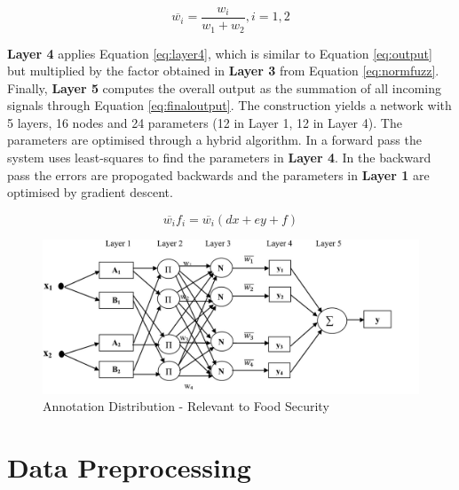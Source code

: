 \begin{equation} \label{eq:normfuzz}
\overline{w_i} =  \frac{w_i}{w_1 + w_2}, i = 1,2 \end{equation}

 \textbf{Layer 4} applies Equation \ref{eq:layer4}, which is similar to Equation \ref{eq:output} but multiplied by the factor obtained in \textbf{Layer 3} from Equation \ref{eq:normfuzz}. Finally, \textbf{Layer 5} computes the overall output as the summation of all incoming signals through Equation \ref{eq:finaloutput}. The construction yields a network with 5 layers,  16 nodes and 24 parameters (12 in Layer 1, 12 in Layer 4). The parameters are optimised through a hybrid algorithm. In a forward pass the system uses least-squares to find the parameters in \textbf{Layer 4}. In the backward pass the errors are propogated backwards and the parameters in \textbf{Layer 1} are optimised by gradient descent.  
 
 \begin{equation} \label{eq:layer4}
 \overline{w_i} f_i =  \overline{w_i }(dx + ey + f) \end{equation}



\begin{figure}[H]
        \centering
         \includegraphics[width=1\textwidth ]{img/model/gnn_fuzz}      
        \caption{Annotation Distribution - Relevant to Food Security}
        \label{fig:gnn_fuzz}
\end{figure}





\section{Data Preprocessing}
\label{dataprocessing}

